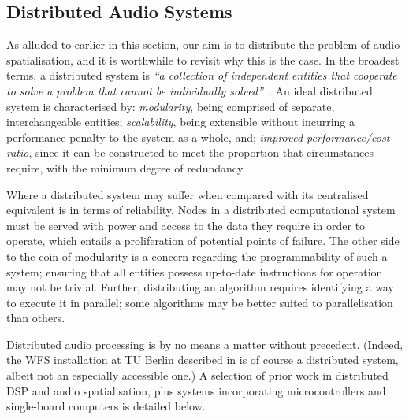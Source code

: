 \subsection{Distributed Audio Systems}\label{subsec:distributed-audio-systems}


As alluded to earlier in this section, our aim is to distribute the problem of
audio spatialisation, and it is worthwhile to revisit why this is the case.
In the broadest terms, a distributed system is \textit{``a collection of
independent entities that cooperate to solve a problem that cannot be
individually solved''}~\citep{kshemkalyani_distributed_2011}.
An ideal distributed system is characterised by: \textit{modularity}, being
comprised of separate, interchangeable entities; \textit{scalability}, being
extensible without incurring a performance penalty to the system as a whole,
and; \textit{improved performance/cost ratio}, since it can be constructed to
meet the proportion that circumstances require, with the minimum degree of
redundancy.

Where a distributed system may suffer when compared with its centralised
equivalent is in terms of reliability.
Nodes in a distributed computational system must be served with power and access
to the data they require in order to operate, which entails a proliferation of
potential points of failure.
The other side to the coin of modularity is a concern regarding the
programmability of such a system;
ensuring that all entities possess up-to-date instructions for operation may not
be trivial.
Further, distributing an algorithm requires identifying a way to execute it in
parallel;
some algorithms may be better suited to parallelisation than others.

Distributed audio processing is by no means a matter without precedent.
(Indeed, the WFS installation at TU Berlin described in
 is of course a distributed system, albeit not
an especially accessible one.)
A selection of prior work in distributed DSP and audio spatialisation, plus
systems incorporating microcontrollers and single-board computers is detailed
below.

